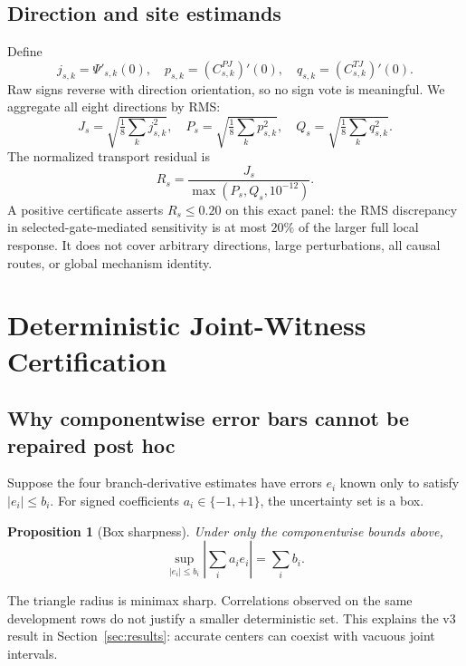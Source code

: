 \documentclass{article}
\newtheorem{proposition}{Proposition}
\begin{document}
\subsection{Direction and site estimands}
Define
\begin{equation}
    j_{s,k}=\Psi'_{s,k}(0),\quad
    p_{s,k}=(C^{PJ}_{s,k})'(0),\quad
    q_{s,k}=(C^{TJ}_{s,k})'(0).
\end{equation}
Raw signs reverse with direction orientation, so no sign vote is meaningful. We aggregate all eight directions by RMS:
\begin{equation}
J_s=\sqrt{\tfrac18\sum_k j_{s,k}^2},\quad
P_s=\sqrt{\tfrac18\sum_k p_{s,k}^2},\quad
Q_s=\sqrt{\tfrac18\sum_k q_{s,k}^2}.
\end{equation}
The normalized transport residual is
\begin{equation}
    R_s=\frac{J_s}{\max(P_s,Q_s,10^{-12})}.
    \label{eq:ratio}
\end{equation}
A positive certificate asserts $R_s\le0.20$ on this exact panel: the RMS discrepancy in selected-gate-mediated sensitivity is at most $20\%$ of the larger full local response. It does not cover arbitrary directions, large perturbations, all causal routes, or global mechanism identity.

\section{Deterministic Joint-Witness Certification}
\label{sec:method}

\subsection{Why componentwise error bars cannot be repaired post hoc}
Suppose the four branch-derivative estimates have errors $e_i$ known only to satisfy $|e_i|\le b_i$. For signed coefficients $a_i\in\{-1,+1\}$, the uncertainty set is a box.
\begin{proposition}[Box sharpness]
\label{prop:box}
Under only the componentwise bounds above,
\begin{equation}
    \sup_{|e_i|\le b_i}\left|\sum_i a_i e_i\right|=\sum_i b_i.
\end{equation}
\end{proposition}
The triangle radius is minimax sharp. Correlations observed on the same development rows do not justify a smaller deterministic set. This explains the v3 result in Section~\ref{sec:results}: accurate centers can coexist with vacuous joint intervals.
\end{document}
